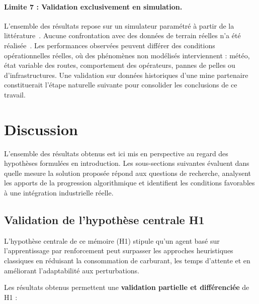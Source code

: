 \documentclass[11pt,a4paper]{report}
\begin{document}
\paragraph{Limite 7 : Validation exclusivement en simulation.}
L'ensemble des résultats repose sur un simulateur paramétré à partir de la littérature~\cite{Afrapoli2017, MehrnazMohtasham2023}. Aucune confrontation avec des données de terrain réelles n'a été réalisée~\cite{HazrathosseiniAfrapoli2024}. Les performances observées peuvent différer des conditions opérationnelles réelles, où des phénomènes non modélisés interviennent : météo, état variable des routes, comportement des opérateurs, pannes de pelles ou d'infrastructures. Une validation sur données historiques d'une mine partenaire constituerait l'étape naturelle suivante pour consolider les conclusions de ce travail.

\section{Discussion}
\label{sec:discussion}

L'ensemble des résultats obtenus est ici mis en perspective au regard des hypothèses formulées en introduction. Les sous-sections suivantes évaluent dans quelle mesure la solution proposée répond aux questions de recherche, analysent les apports de la progression algorithmique et identifient les conditions favorables à une intégration industrielle réelle.

\subsection{Validation de l'hypothèse centrale H1}

L'hypothèse centrale de ce mémoire (H1) stipule qu'un agent basé sur l'apprentissage par renforcement peut surpasser les approches heuristiques classiques en réduisant la consommation de carburant, les temps d'attente et en améliorant l'adaptabilité aux perturbations.

Les résultats obtenus permettent une \textbf{validation partielle et différenciée} de H1 :
\end{document}
